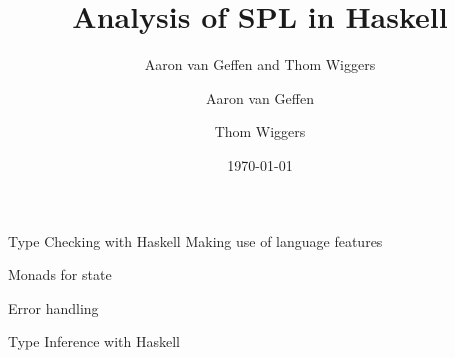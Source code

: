 \documentclass[department=icis, slidenumbers=slide, official=true]{beamerruhuisstijl}
\title{Analysis of SPL in Haskell}
\subtitle{Aaron van Geffen and Thom Wiggers}
\date{\today}
\author{Aaron van Geffen \and Thom Wiggers}
\begin{document}
\begin{frame}
    \titlepage{}
\end{frame}

%
%
%
%


\begin{frame}{Type Checking with Haskell}
    Making use of language features

    Monads for state

    Error handling
\end{frame}

\begin{frame}{Type Inference with Haskell}
    
\end{frame}
\end{document}
